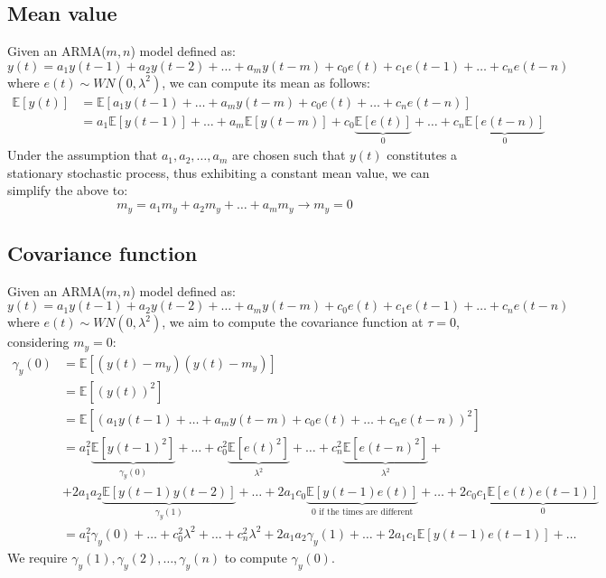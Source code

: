 \subsection{Mean value}
Given an ARMA($m,n$) model defined as:
\[y(t)=a_1y(t-1)+a_2y(t-2)+\dots+a_m y(t-m)+c_0e(t)+c_1e(t-1)+\dots+c_n e(t-n)\]
where $e(t)\sim WN(0,\lambda^2)$, we can compute its mean as follows:
\begin{align*}
    \mathbb{E}\left[y(t)\right] &= \mathbb{E}\left[a_1y(t-1)+\dots+a_m y(t-m)+c_0e(t)+\dots+c_n e(t-n)\right] \\
                                &= a_1\mathbb{E}\left[y(t-1)\right]+\dots+a_m\mathbb{E}\left[y(t-m)\right] +c_0\underbrace{\mathbb{E}\left[e(t)\right]}_0 +\dots+c_n\underbrace{\mathbb{E}\left[e(t-n)\right]}_0
\end{align*}
Under the assumption that $a_1,a_2,\dots,a_m$ are chosen such that $y(t)$ constitutes a stationary stochastic process, thus exhibiting a constant mean value, we can simplify the above to:
\[m_y=a_1m_y+a_2m_y+\dots+a_m m_y \rightarrow m_y=0\]

\subsection{Covariance function}
Given an ARMA($m,n$) model defined as:
\[y(t)=a_1y(t-1)+a_2y(t-2)+\dots+a_m y(t-m)+c_0e(t)+c_1e(t-1)+\dots+c_n e(t-n)\]
where $e(t)\sim WN(0,\lambda^2)$, we aim to compute the covariance function at $\tau=0$, considering $m_y=0$:
\begin{align*}
    \gamma_y(0) &=\mathbb{E}\left[ \left(y(t)-m_y\right)\left(y(t)-m_y\right) \right] \\
                &=\mathbb{E}\left[ {\left(y(t)\right)}^2 \right] \\
                &=\mathbb{E}\left[ {\left(a_1y(t-1)+\dots+a_m y(t-m)+c_0e(t)+\dots+c_n e(t-n)\right)}^2 \right] \\      
                &=a_1^2\underbrace{\mathbb{E}\left[ {y(t-1)}^2 \right]}_{\gamma_y(0)} +\dots+c_0^2\underbrace{\mathbb{E}\left[ {e(t)}^2 \right]}_{\lambda^2} +\dots+c_n^2 \underbrace{\mathbb{E}\left[ {e(t-n)}^2 \right]}_{\lambda^2}  +\\
                &+ 2a_1a_2\underbrace{\mathbb{E}\left[ y(t-1)y(t-2) \right]}_{\gamma_y(1)}  + \dots + 2a_1c_0\underbrace{\mathbb{E}\left[ y(t-1)e(t) \right]}_{0 \text{ if the times are different}}  + \dots + 2c_0c_1\underbrace{\mathbb{E}\left[ e(t)e(t-1) \right]}_0  \\   
                &=a_1^2\gamma_y(0) +\dots+c_0^2\lambda^2 +\dots+c_n^2 \lambda^2  + 2a_1a_2\gamma_y(1)  + \dots + 2a_1c_1\mathbb{E}\left[ y(t-1)e(t-1) \right]+\dots    
\end{align*}
We require $\gamma_y(1),\gamma_y(2),\dots,\gamma_y(n)$ to compute $\gamma_y(0)$.

